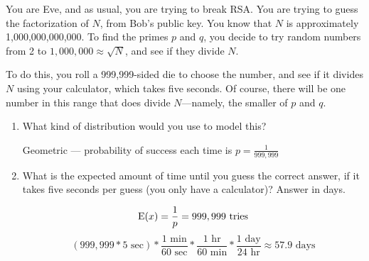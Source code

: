 \question You are Eve, and as usual, you are trying to break RSA. 
You are trying to guess the factorization of $N$, from Bob’s public 
key. You know that $N$ is approximately 1,000,000,000,000. To find the 
primes $p$ and $q$, you decide to try random numbers from 2 to 
$1,000,000 \approx \sqrt{N}$, and see if they divide $N$.

To do this, you roll a 999,999-sided die to choose the number, and see 
if it divides $N$ using your calculator, which takes five seconds. Of 
course, there will be one number in this range that does divide $N$—namely, 
the smaller of $p$ and $q$.
\begin{enumerate}[label=(\alph*)]
\item What kind of distribution would you use to model this?
\begin{solution}[1cm]
Geometric — probability of success each time is $p = \frac{1}{999,999}$
\end{solution}

\item What is the expected amount of time until you guess the correct 
answer, if it takes five seconds per guess (you only have a calculator)? 
Answer in days.
		\begin{solution}[2cm]
\[\text{E}(x) = \frac{1}{p} = 999,999 \text{ tries}\]
		\[(999,999 * 5 \text{ sec}) * \frac{1 \text{ min}}{60 \text{ sec}} * \frac{1 \text{ hr}}{60 \text{ min}} * \frac{1 \text{ day}}{24 \text{ hr}} \approx 57.9 \text{ days}\]
\end{solution}


\end{enumerate}